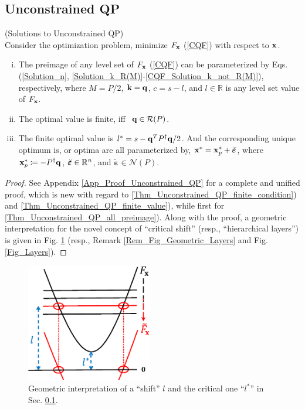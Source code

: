 \documentclass{imaman}
\newcommand{\bfx}{{\bf x}}
\newcommand{\bfq}{{\bf q}}
\newcommand{\bfk}{{\bf k}}
\newcommand{\bfvarepsilon}{{\boldsymbol \varepsilon}}
\newcommand{\real}{\mathbb{R}}
\newcommand{\calN}{{\mathcal N}}
\newcommand{\calR}{{\mathcal R}}
\newcommand{\itn}{{\it n}}
\numberwithin{equation}{section}
\begin{document}
\subsection{Unconstrained QP}
\label{Subsec_Unconstrained_QP}

\begin{theorem} (Solutions to Unconstrained QP)\\
Consider the optimization problem, minimize $F_\bfx$ {\rm(\ref{CQF})} with respect to $\bfx$.
\begin{enumerate}[i)]
\item\label{Thm_Unconstrained_QP_all_preimage} The preimage of any level set of $F_\bfx$ {\rm(\ref{CQF})} can be parameterized by Eqs. {\rm(\ref{Solution_n}}, {\rm\ref{Solution_k_R(M)}-\ref{CQF_Solution_k_not_R(M)})}, respectively, where $M=P/2$, $\bfk=\bfq$, $c=s-l$, and $l\in\real$ is any level set value of $F_\bfx$.
\item\label{Thm_Unconstrained_QP_finite_condition} The optimal value is finite, iff $~\bfq\in\calR(P)$.
\item\label{Thm_Unconstrained_QP_finite_value} The finite optimal value is $l^*=s-\bfq^T P^\dagger\bfq/2$. And the corresponding unique optimum is, or optima are all parameterized by, $\bfx^*=\bfx_p^*+\breve\bfvarepsilon$, where $\bfx_p^*\coloneqq-P^\dagger\bfq$, $\breve\bfvarepsilon\in\real^\itn$, and $\breve\bfvarepsilon\in \calN(P)$.
\end{enumerate}
\label{Thm_Unconstrained_QP}
\end{theorem}

\begin{proof}
See Appendix \ref{App_Proof_Unconstrained_QP} for a complete and unified proof, which is new with regard to \ref{Thm_Unconstrained_QP_finite_condition}) and \ref{Thm_Unconstrained_QP_finite_value}), while first for \ref{Thm_Unconstrained_QP_all_preimage}). Along with the proof, a geometric interpretation for the novel concept of ``critical shift'' (resp., ``hierarchical layers'') is given in Fig. \ref{Fig_Shift} (resp., Remark \ref{Rem_Fig_Geometric_Layers} and Fig. \ref{Fig_Layers}).
\end{proof}

\begin{figure}[htbp]
    \begin{center}
    \includegraphics[width=5.5cm]{Fig_Shift.eps}
    \caption{Geometric interpretation of a ``shift'' $l$ and the critical one ``$l^*$'' in Sec. {\rm\ref{Subsec_Unconstrained_QP}}.}
    \label{Fig_Shift}
    \end{center}
\end{figure}
\end{document}
